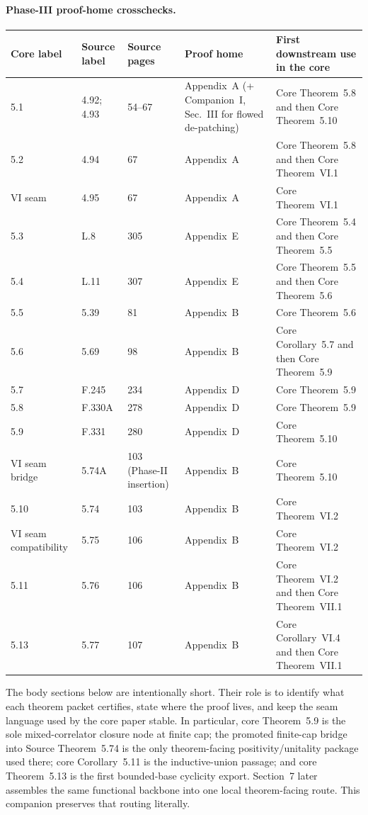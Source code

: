 \documentclass[preprint,aip,jmp,amsmath,amssymb,nofootinbib]{revtex4-2}
\begin{document}
\paragraph{Phase-III proof-home crosschecks.}
\begin{center}
\small
\setlength{\tabcolsep}{4pt}
\renewcommand{\arraystretch}{1.08}
\begin{tabular}{@{}p{0.9cm}p{1.1cm}p{1.35cm}p{3.75cm}p{3.1cm}@{}}
\toprule
\textbf{Core label} & \textbf{Source label} & \textbf{Source pages} & \textbf{Proof home} & \textbf{First downstream use in the core}\\
\midrule
5.1 & 4.92; 4.93 & 54--67 & Appendix~A (+ Companion~I, Sec.~III for flowed de-patching) & Core Theorem~5.8 and then Core Theorem~5.10\\
5.2 & 4.94 & 67 & Appendix~A & Core Theorem~5.8 and then Core Theorem~VI.1\\
VI seam & 4.95 & 67 & Appendix~A & Core Theorem~VI.1\\
5.3 & L.8 & 305 & Appendix~E & Core Theorem~5.4 and then Core Theorem~5.5\\
5.4 & L.11 & 307 & Appendix~E & Core Theorem~5.5 and then Core Theorem~5.6\\
5.5 & 5.39 & 81 & Appendix~B & Core Theorem~5.6\\
5.6 & 5.69 & 98 & Appendix~B & Core Corollary~5.7 and then Core Theorem~5.9\\
5.7 & F.245 & 234 & Appendix~D & Core Theorem~5.9\\
5.8 & F.330A & 278 & Appendix~D & Core Theorem~5.9\\
5.9 & F.331 & 280 & Appendix~D & Core Theorem~5.10\\
VI seam bridge & 5.74A & 103 (Phase-II insertion) & Appendix~B & Core Theorem~5.10\\
5.10 & 5.74 & 103 & Appendix~B & Core Theorem~VI.2\\
VI seam compatibility & 5.75 & 106 & Appendix~B & Core Theorem~VI.2\\
5.11 & 5.76 & 106 & Appendix~B & Core Theorem~VI.2 and then Core Theorem~VII.1\\
5.13 & 5.77 & 107 & Appendix~B & Core Corollary~VI.4 and then Core Theorem~VII.1\\
\bottomrule
\end{tabular}
\end{center}

The body sections below are intentionally short. Their role is to identify what each theorem packet certifies, state where the proof lives, and keep the seam language used by the core paper stable. In particular, core Theorem~5.9 is the sole mixed-correlator closure node at finite cap; the promoted finite-cap bridge into Source Theorem~5.74 is the only theorem-facing positivity/unitality package used there; core Corollary~5.11 is the inductive-union passage; and core Theorem~5.13 is the first bounded-base cyclicity export. Section~7 later assembles the same functional backbone into one local theorem-facing route. This companion preserves that routing literally.
\end{document}
